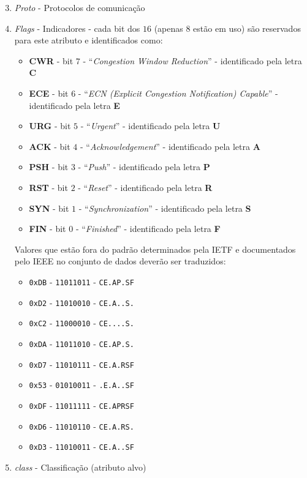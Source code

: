 \documentclass[twoside]{article}
\begin{document}
\begin{enumerate}
    \setcounter{enumi}{2}
    \item \textit{Proto} - Protocolos de comunicação
    \setcounter{enumi}{10}
    \item \textit{Flags} - Indicadores  - cada \gls{bit} dos $16$ (apenas $8$ estão em uso) são reservados para este atributo e identificados como: 
        \begin{itemize}
            \item \textbf{CWR} - \gls{bit} $7$ - ``\textit{Congestion Window Reduction}'' - identificado pela letra \textbf{C}
            \item \textbf{ECE} - \gls{bit} $6$ - ``\textit{ECN (Explicit Congestion Notification) Capable}'' - identificado pela letra \textbf{E}
            \item \textbf{URG} - \gls{bit} $5$ - ``\textit{Urgent}'' - identificado pela letra \textbf{U}
            \item \textbf{ACK} - \gls{bit} $4$ - ``\textit{Acknowledgement}'' - identificado pela letra \textbf{A}
            \item \textbf{PSH} - \gls{bit} $3$ - ``\textit{Push}'' - identificado pela letra \textbf{P}
            \item \textbf{RST} - \gls{bit} $2$ - ``\textit{Reset}'' - identificado pela letra \textbf{R}
            \item \textbf{SYN} - \gls{bit} $1$ - ``\textit{Synchronization}'' - identificado pela letra \textbf{S}
            \item \textbf{FIN} - \gls{bit} $0$ - ``\textit{Finished}'' - identificado pela letra \textbf{F}
        \end{itemize}
        Valores que estão fora do padrão determinados pela \gls{IETF} e documentados pelo \gls{IEEE} no conjunto de dados deverão ser traduzidos:
        \begin{itemize}
            \item \texttt{0xDB} - \texttt{11011011} - \texttt{CE.AP.SF}
            \item \texttt{0xD2} - \texttt{11010010} - \texttt{CE.A..S.}
            \item \texttt{0xC2} - \texttt{11000010} - \texttt{CE....S.}
            \item \texttt{0xDA} - \texttt{11011010} - \texttt{CE.AP.S.}
            \item \texttt{0xD7} - \texttt{11010111} - \texttt{CE.A.RSF}
            \item \texttt{0x53} - \texttt{01010011} - \texttt{.E.A..SF}
            \item \texttt{0xDF} - \texttt{11011111} - \texttt{CE.APRSF}
            \item \texttt{0xD6} - \texttt{11010110} - \texttt{CE.A.RS.}
            \item \texttt{0xD3} - \texttt{11010011} - \texttt{CE.A..SF}
        \end{itemize}
        \setcounter{enumi}{12}
    \item \textit{class} - Classificação (atributo alvo)
\end{enumerate}
\end{document}
